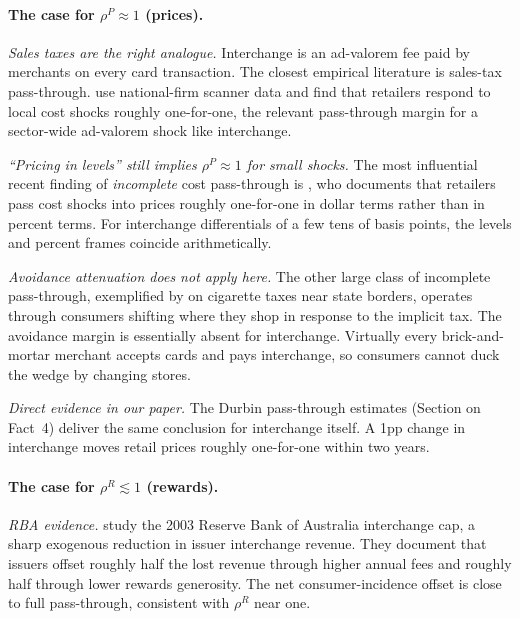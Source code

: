 \documentclass[11pt]{article}
\begin{document}
\paragraph{The case for $\rho^P \approx 1$ (prices).}

\textit{Sales taxes are the right analogue.}
Interchange is an ad-valorem fee paid by merchants on every card transaction.
The closest empirical literature is sales-tax pass-through.
\citet{Butters.etal2022} use national-firm scanner data and find that retailers respond to local cost shocks roughly one-for-one, the relevant pass-through margin for a sector-wide ad-valorem shock like interchange.

\textit{``Pricing in levels'' still implies $\rho^P \approx 1$ for small shocks.}
The most influential recent finding of \emph{incomplete} cost pass-through is \citet{Sangani2026}, who documents that retailers pass cost shocks into prices roughly one-for-one in dollar terms rather than in percent terms.
For interchange differentials of a few tens of basis points, the levels and percent frames coincide arithmetically.

\textit{Avoidance attenuation does not apply here.}
The other large class of incomplete pass-through, exemplified by \citet{Harding.etal2012} on cigarette taxes near state borders, operates through consumers shifting where they shop in response to the implicit tax.
The avoidance margin is essentially absent for interchange.
Virtually every brick-and-mortar merchant accepts cards and pays interchange, so consumers cannot duck the wedge by changing stores.

\textit{Direct evidence in our paper.}
The Durbin pass-through estimates (Section on Fact~4) deliver the same conclusion for interchange itself.
A 1pp change in interchange moves retail prices roughly one-for-one within two years.

\paragraph{The case for $\rho^R \lesssim 1$ (rewards).}

\textit{RBA evidence.}
\citet{Chang.etal2005} study the 2003 Reserve Bank of Australia interchange cap, a sharp exogenous reduction in issuer interchange revenue.
They document that issuers offset roughly half the lost revenue through higher annual fees and roughly half through lower rewards generosity.
The net consumer-incidence offset is close to full pass-through, consistent with $\rho^R$ near one.
\end{document}
